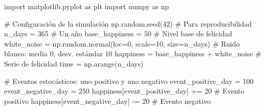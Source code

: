 \documentclass[
  stu,
  floatsintext,
  longtable,
  a4paper,
  nolmodern,
  notxfonts,
  notimes,
  12pt,
  colorlinks=true,linkcolor=blue,citecolor=blue,urlcolor=blue]{apa7}
\newenvironment{Shaded}{\begin{snugshade}}{\end{snugshade}}
\newcommand{\CommentTok}[1]{\textcolor[rgb]{0.37,0.37,0.37}{#1}}
\newcommand{\DecValTok}[1]{\textcolor[rgb]{0.68,0.00,0.00}{#1}}
\newcommand{\ImportTok}[1]{\textcolor[rgb]{0.00,0.46,0.62}{#1}}
\newcommand{\NormalTok}[1]{\textcolor[rgb]{0.00,0.23,0.31}{#1}}
\newcommand{\OperatorTok}[1]{\textcolor[rgb]{0.37,0.37,0.37}{#1}}
\begin{document}
\begin{Shaded}
\begin{Highlighting}[]
\ImportTok{import}\NormalTok{ matplotlib.pyplot }\ImportTok{as}\NormalTok{ plt}
\ImportTok{import}\NormalTok{ numpy }\ImportTok{as}\NormalTok{ np}

\CommentTok{\# Configuración de la simulación}
\NormalTok{np.random.seed(}\DecValTok{42}\NormalTok{)  }\CommentTok{\# Para reproducibilidad}
\NormalTok{n\_days }\OperatorTok{=} \DecValTok{365}  \CommentTok{\# Un año}
\NormalTok{base\_happiness }\OperatorTok{=} \DecValTok{50}  \CommentTok{\# Nivel base de felicidad}
\NormalTok{white\_noise }\OperatorTok{=}\NormalTok{ np.random.normal(loc}\OperatorTok{=}\DecValTok{0}\NormalTok{, scale}\OperatorTok{=}\DecValTok{10}\NormalTok{, size}\OperatorTok{=}\NormalTok{n\_days)  }\CommentTok{\# Ruido blanco: media 0, desv. estándar 10}
\NormalTok{happiness }\OperatorTok{=}\NormalTok{ base\_happiness }\OperatorTok{+}\NormalTok{ white\_noise  }\CommentTok{\# Serie de felicidad}
\NormalTok{time }\OperatorTok{=}\NormalTok{ np.arange(n\_days)}

\CommentTok{\# Eventos estocásticos: uno positivo y uno negativo}
\NormalTok{event\_positive\_day }\OperatorTok{=} \DecValTok{100}
\NormalTok{event\_negative\_day }\OperatorTok{=} \DecValTok{250}
\NormalTok{happiness[event\_positive\_day] }\OperatorTok{+=} \DecValTok{20}  \CommentTok{\# Evento positivo}
\NormalTok{happiness[event\_negative\_day] }\OperatorTok{{-}=} \DecValTok{20}  \CommentTok{\# Evento negativo}


\end{Highlighting}
\end{Shaded}
\end{document}
